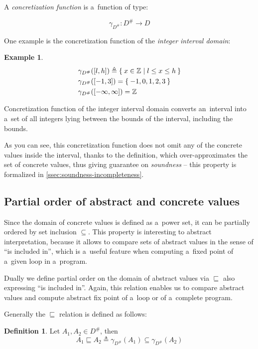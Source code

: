 \documentclass[12pt,oneside]{fithesis2}
\theoremstyle{definition}
\newtheorem{exmp}{Example}[section]
\newtheorem{definition}{Definition}
\begin{document}
A \textit{concretization function} is a~function of type:

\[
\gamma_{D^\#}\colon D^\# \to D
\]

One example is the concretization function of the \textit{integer interval domain}:

\begin{exmp}
  \begin{align*}
    &\gamma_{D^\#}([l,h]) \triangleq \Set{x \in \mathbb Z | l \le x \le h}\\
    &\gamma_{D^\#}([-1,3]) = \Set{-1, 0, 1, 2, 3}\\
    &\gamma_{D^\#}([-\infty, \infty]) = \mathbb Z
  \end{align*}
\end{exmp}

Concretization function of the integer interval domain converts an~interval into a~set of all integers lying between the bounds of the interval, including the bounds.

As you can see, this concretization function does not omit any of the concrete values inside the interval, thanks to the definition, which over-approximates the set of concrete values, thus giving guarantee on \textit{soundness} -- this property is formalized in \ref{ssec:soundness-incompleteness}.

\subsection{Partial order of abstract and concrete values}

Since the domain of concrete values is defined as a~power set, it can be partially ordered by set inclusion $\subseteq$. This property is interesting to abstract interpretation, because it allows to compare sets of abstract values in the sense of ``is included in'', which is a~useful feature when computing a~fixed point of a~given loop in a~program.

Dually we define partial order on the domain of abstract values via $\sqsubseteq$ also expressing ``is included in''. Again, this relation enables us to compare abstract values and compute abstract fix point of a~loop or of a~complete program.

Generally the $\sqsubseteq$ relation is defined as follows:

\begin{definition}
  Let $A_1, A_2 \in D^\#$, then
  \[
    A_1 \sqsubseteq A_2 \triangleq \gamma_{D^\#}(A_1) \subseteq \gamma_{D^\#}(A_2)
  \]
\end{definition}
\end{document}
